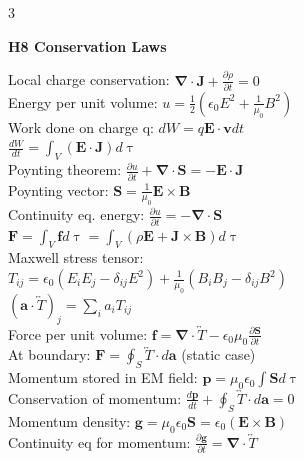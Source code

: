 \documentclass[a4paper,twoside]{article}
\newcommand{\secblock}[1]{%
\par\vspace{3pt}%
\noindent\colorbox{hdrcol}{\parbox[c][1.1em][c]{0.98\linewidth}{\color{white}\bfseries\small #1}}\par
\vspace{2pt}%
}
\begin{document}
\begin{multicols*}{3}
\secblock{H8 Conservation Laws}
Local charge conservation: \(\bm \nabla \cdot \bm J + \frac{\partial \rho}{\partial t} = 0\)\\
Energy per unit volume: \(u = \frac{1}{2} (\epsilon_0 E^2 + \frac{1}{\mu_0} B^2)\)\\
Work done on charge q: \(dW = q \bm E \cdot \bm v dt\) \\
\(\frac{dW}{dt} = \int_{V} (\bm E \cdot \bm J) d\uptau\) \\
Poynting theorem: \(\frac{\partial u}{\partial t} + \bm \nabla \cdot \bm S = -\bm E \cdot \bm J\)\\
Poynting vector: \(\bm S = \frac{1}{\mu_0} \bm E \times \bm B\)\\
Continuity eq. energy: \(\frac{\partial u}{\partial t} = -\bm \nabla \cdot \bm S \)\\
\(\bm F = \int_V \bm f d\uptau = \int_V (\rho \bm E + \bm J \times \bm B) d\uptau \)\\
Maxwell stress tensor:\\
\(T_{ij} = \epsilon_0 (E_iE_j-\delta_{ij}E^2) +\frac{1}{\mu_0} (B_iB_j-\delta_{ij}B^2)\)\\
\((\bm a \cdot \overleftrightarrow{T})_j = \sum_i a_i T_{ij}\)\\
Force per unit volume: \(\bm f = \bm\nabla \cdot \overleftrightarrow{T} - \epsilon_0 \mu_0 \frac{\partial \bm S}{\partial t}\)\\
At boundary: \(\bm F = \oint _S \overleftrightarrow{T} \cdot d\bm a\) (static case)\\
Momentum stored in EM field: \(\bm p = \mu_0 \epsilon_0 \int \bm S d\uptau  \)\\
Conservation of momentum: \(\frac{d\bm p}{dt} + \oint_S \overleftrightarrow{T} \cdot d\bm a = 0\)\\
Momentum density:  \(\bm g =  \mu_0 \epsilon_0 \bm S = \epsilon_0 (\bm E \times \bm B)\)\\
Continuity eq for momentum: \(\frac{\partial \bm g}{\partial t} = \bm \nabla \cdot \overleftrightarrow{T} \)


\end{multicols*}
\end{document}
